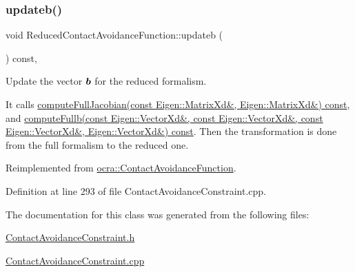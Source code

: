 \subsubsection{\texorpdfstring{updateb()}{updateb()}}
{\footnotesize\ttfamily void Reduced\+Contact\+Avoidance\+Function\+::updateb (\begin{DoxyParamCaption}{ }\end{DoxyParamCaption}) const\hspace{0.3cm}{\ttfamily [protected]}, {\ttfamily [virtual]}}

Update the vector $ \mbox{\boldmath${b}$} $ for the reduced formalism.

It calls \hyperlink{classocra_1_1ContactAvoidanceFunction_a59994d2c3f364575ecff7fb23b7e10ab}{compute\+Full\+Jacobian(const Eigen\+::\+Matrix\+Xd\&, Eigen\+::\+Matrix\+Xd\&) const}, and \hyperlink{classocra_1_1ContactAvoidanceFunction_a9afd02871f0d26321b526290f565d541}{compute\+Fullb(const Eigen\+::\+Vector\+Xd\&, const Eigen\+::\+Vector\+Xd\&, const Eigen\+::\+Vector\+Xd\&, Eigen\+::\+Vector\+Xd\&) const}. Then the transformation is done from the full formalism to the reduced one. 

Reimplemented from \hyperlink{classocra_1_1ContactAvoidanceFunction_aed2f145f17ff9fd8dd646018376ea7e9}{ocra\+::\+Contact\+Avoidance\+Function}.



Definition at line 293 of file Contact\+Avoidance\+Constraint.\+cpp.



The documentation for this class was generated from the following files\+:\begin{DoxyCompactItemize}
\item 
\hyperlink{ContactAvoidanceConstraint_8h}{Contact\+Avoidance\+Constraint.\+h}\item 
\hyperlink{ContactAvoidanceConstraint_8cpp}{Contact\+Avoidance\+Constraint.\+cpp}\end{DoxyCompactItemize}
